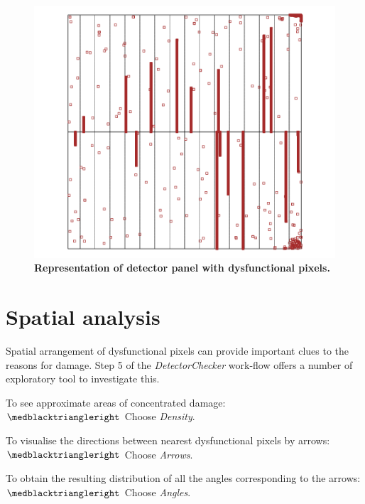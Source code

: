\documentclass[11pt,a4paper]{article}
\newcommand{\DetectorChecker}{\emph{DetectorChecker}\xspace}
\begin{document}
\begin{figure}[htbp]
\begin{center}
\includegraphics[width=11.5cm]{damagedPixels.png}
\caption
{
{\bfseries Representation of detector panel with dysfunctional pixels.}
}
\label{damagedPixels}
\end{center}
\end{figure}



\section{Spatial analysis}\label{spatial}

Spatial arrangement of dysfunctional pixels
can provide important clues to the reasons for damage.
Step 5 of the \DetectorChecker work-flow 
offers a number of exploratory tool to investigate this.

To see approximate areas of concentrated damage:\\
$\medblacktriangleright$ Choose \emph{Density}.

To visualise the directions between nearest dysfunctional pixels by arrows:
\\
$\medblacktriangleright$ Choose \emph{Arrows}.

To obtain the resulting distribution of all the angles corresponding to the arrows:\\ 
$\medblacktriangleright$ Choose \emph{Angles}.
\end{document}
